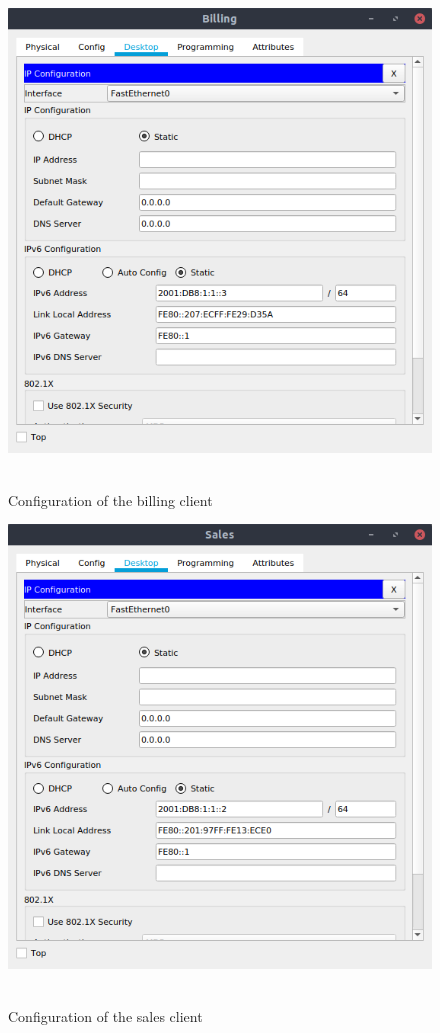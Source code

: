 \documentclass[conference]{IEEEtran}
\begin{document}
\begin{center}
\begin{figure}[h]
\includegraphics[scale=0.45]{resources/q31.png}\
\caption{Configuration of the billing client}
\label{client_billing}
\end{figure}
\end{center}

\begin{center}
\begin{figure}[h]
\includegraphics[scale=0.45]{resources/q32.png}\
\caption{Configuration of the sales client}
\label{client_sales}
\end{figure}
\end{center}
\end{document}
